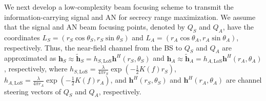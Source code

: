 \documentclass[10pt,technote]{IEEEtran}
\newcommand{\1}{\mathbbm{1}}
\begin{document}
We next develop a low-complexity beam focusing scheme to transmit the information-carrying signal and AN for secrecy range maximization. We assume that the signal and AN beam focusing points, denoted by $Q_S$ and $Q_A$, have the coordinates $L_S=(r_S\cos\theta_S,r_S\sin\theta_S)$ and $L_A=(r_A\cos\theta_A,r_A\sin\theta_A)$, respectively. Thus, the near-field channel from the BS to $Q_S$ and $Q_A$ 
are approximated as $\mathbf{h}_S\approx \tilde{\mathbf{h}}_S= h_{S,\mathrm{LoS}} \mathbf{h}^{H}(r_S,\theta_S)$ and $\mathbf{h}_A\approx \tilde{\mathbf{h}}_A =h_{A,\mathrm{LoS}} \mathbf{h}^{H}(r_A,\theta_A)$, respectively, where $h_{S,\mathrm{LoS}} = \frac{\lambda}{4\pi  r_S}\exp\left(-\frac{1}{2}K(f)r_S\right)$, $h_{A,\mathrm{LoS}} = \frac{\lambda}{4\pi r_A}\exp\left(-\frac{1}{2}K(f)r_A\right)$, and $ \mathbf{h}^{H}(r_S,\theta_S)$ and $\mathbf{h}^{H}(r_A,\theta_A)$ are channel steering vectors of $Q_S$ and $Q_A$, respectively. 
\end{document}
